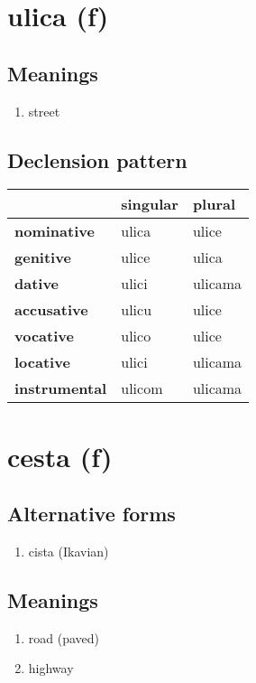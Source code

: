 \filbreak
\section{ulica (f)}
\subsection*{Meanings}
\begin{enumerate}
\item street
\end{enumerate}
\subsection*{Declension pattern}
\begin{tabularx}{\linewidth}{Xll}
\toprule
{} & singular &   plural \\
\midrule
\textbf{nominative  } &    ulica &    ulice \\
\textbf{genitive    } &    ulice &    ulica \\
\textbf{dative      } &    ulici &  ulicama \\
\textbf{accusative  } &    ulicu &    ulice \\
\textbf{vocative    } &    ulico &    ulice \\
\textbf{locative    } &    ulici &  ulicama \\
\textbf{instrumental} &   ulicom &  ulicama \\
\bottomrule
\end{tabularx}

\filbreak
\section{cesta (f)}
\subsection*{Alternative forms}
\begin{enumerate}
\item cista (Ikavian)
\end{enumerate}
\subsection*{Meanings}
\begin{enumerate}
\item road (paved)
\item highway
\end{enumerate}
